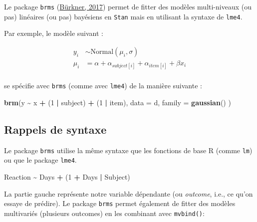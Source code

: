 \documentclass[
  a4paper,11pt,twoside,onecolumn,openright,final,oldfontcommands]{memoir}
\newenvironment{Shaded}{\begin{snugshade}}{\end{snugshade}}
\newcommand{\DataTypeTok}[1]{\textcolor[rgb]{0.13,0.29,0.53}{#1}}
\newcommand{\DecValTok}[1]{\textcolor[rgb]{0.00,0.00,0.81}{#1}}
\newcommand{\KeywordTok}[1]{\textcolor[rgb]{0.13,0.29,0.53}{\textbf{#1}}}
\newcommand{\NormalTok}[1]{#1}
\newcommand{\OperatorTok}[1]{\textcolor[rgb]{0.81,0.36,0.00}{\textbf{#1}}}
\newcommand{\StringTok}[1]{\textcolor[rgb]{0.31,0.60,0.02}{#1}}
\theoremstyle{definition}
\theoremstyle{definition}
\theoremstyle{definition}
\theoremstyle{remark}
\begin{document}
Le package \texttt{brms} (\href{https://www.jstatsoft.org/article/view/v080i01}{Bürkner, 2017}) permet de fitter des modèles multi-niveaux (ou pas) linéaires (ou pas) bayésiens en \texttt{Stan} mais en utilisant la syntaxe de \texttt{lme4}.

Par exemple, le modèle suivant :

\[
\begin{aligned}
y_{i} &\sim \mathrm{Normal}(\mu_{i}, \sigma) \\
\mu_{i} &= \alpha + \alpha_{subject[i]} + \alpha_{item[i]} + \beta x_{i} \\
\end{aligned}
\]

se spécifie avec \texttt{brms} (comme avec \texttt{lme4}) de la manière suivante :

\begin{Shaded}
\begin{Highlighting}[]
\KeywordTok{brm}\NormalTok{(y }\OperatorTok{\textasciitilde{}}\StringTok{ }\NormalTok{x }\OperatorTok{+}\StringTok{ }\NormalTok{(}\DecValTok{1} \OperatorTok{|}\StringTok{ }\NormalTok{subject) }\OperatorTok{+}\StringTok{ }\NormalTok{(}\DecValTok{1} \OperatorTok{|}\StringTok{ }\NormalTok{item), }\DataTypeTok{data =}\NormalTok{ d, }\DataTypeTok{family =} \KeywordTok{gaussian}\NormalTok{() )}
\end{Highlighting}
\end{Shaded}

\hypertarget{rappels-de-syntaxe}{%
\subsection{Rappels de syntaxe}\label{rappels-de-syntaxe}}

Le package \texttt{brms} utilise la même syntaxe que les fonctions de base R (comme \texttt{lm}) ou que le package \texttt{lme4}.

\begin{Shaded}
\begin{Highlighting}[]
\NormalTok{Reaction }\OperatorTok{\textasciitilde{}}\StringTok{ }\NormalTok{Days }\OperatorTok{+}\StringTok{ }\NormalTok{(}\DecValTok{1} \OperatorTok{+}\StringTok{ }\NormalTok{Days }\OperatorTok{|}\StringTok{ }\NormalTok{Subject)}
\end{Highlighting}
\end{Shaded}

La partie gauche représente notre variable dépendante (ou \emph{outcome}, i.e., ce qu'on essaye de prédire). Le package \texttt{brms} permet également de fitter des modèles multivariés (plusieurs outcomes) en les combinant avec \texttt{mvbind()}:
\end{document}
